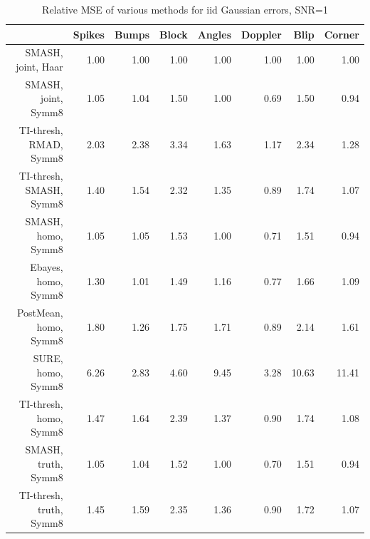 \documentclass[12pt]{article}
\begin{document}
\begin{table}[ht]
\centering
\begin{tabular}{rrrrrrrr}
  \hline
 & Spikes & Bumps & Block & Angles & Doppler & Blip & Corner \\
  \hline
SMASH, joint, Haar & 1.00 & 1.00 & 1.00 & 1.00 & 1.00 & 1.00 & 1.00 \\
  SMASH, joint, Symm8 & 1.05 & 1.04 & 1.50 & 1.00 & 0.69 & 1.50 & 0.94 \\
  TI-thresh, RMAD, Symm8 & 2.03 & 2.38 & 3.34 & 1.63 & 1.17 & 2.34 & 1.28 \\
  TI-thresh, SMASH, Symm8 & 1.40 & 1.54 & 2.32 & 1.35 & 0.89 & 1.74 & 1.07 \\
  SMASH, homo, Symm8 & 1.05 & 1.05 & 1.53 & 1.00 & 0.71 & 1.51 & 0.94 \\
  Ebayes, homo, Symm8 & 1.30 & 1.01 & 1.49 & 1.16 & 0.77 & 1.66 & 1.09 \\
  PostMean, homo, Symm8 & 1.80 & 1.26 & 1.75 & 1.71 & 0.89 & 2.14 & 1.61 \\
  SURE, homo, Symm8 & 6.26 & 2.83 & 4.60 & 9.45 & 3.28 & 10.63 & 11.41 \\
  TI-thresh, homo, Symm8 & 1.47 & 1.64 & 2.39 & 1.37 & 0.90 & 1.74 & 1.08 \\
  SMASH, truth, Symm8 & 1.05 & 1.04 & 1.52 & 1.00 & 0.70 & 1.51 & 0.94 \\
  TI-thresh, truth, Symm8 & 1.45 & 1.59 & 2.35 & 1.36 & 0.90 & 1.72 & 1.07 \\
   \hline
\end{tabular}
\caption{Relative MSE of various methods for iid Gaussian errors, SNR=1}
\label{table:homo1}
\end{table}
\end{document}
